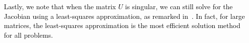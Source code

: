 \documentclass[11pt]{article}
\newcommand{\bsnote}[1]{\noindent\textcolor{red}{\texttt{Bartolomeo: #1}}}
\newcommand{\RC}[1]{\textcolor{black}{#1}}
\begin{document}
\begin{appendices}
\RC{Lastly, we note that when the matrix $U$ is singular, we can still solve for the Jacobian using a least-squares approximation, as remarked in~\cite[Appendix B]{cvxpylayers2019}. In fact, for large matrices, the least-squares approximation is the most efficient solution method for all problems.}




\end{appendices}
\end{document}
